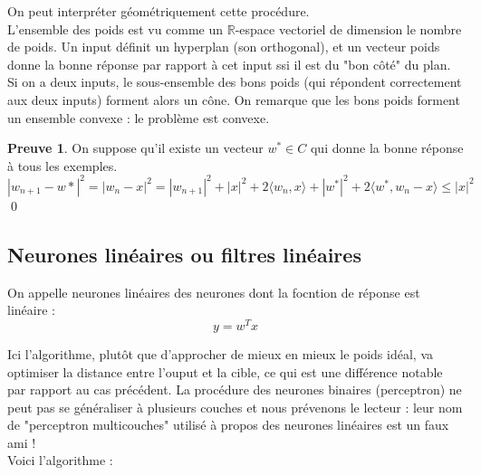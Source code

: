\documentclass{article}
\theoremstyle{definition}
\newtheorem{dem}{Preuve}
\newcommand{\R}{\mathbb R}
\begin{document}
On peut interpréter géométriquement cette procédure.\\

L'ensemble des poids est vu comme un $\R$-espace vectoriel de dimension le nombre de poids. Un input définit un hyperplan (son orthogonal), et un vecteur poids donne la bonne réponse par rapport à cet input ssi il est du "bon côté" du plan. Si on a deux inputs, le sous-ensemble des bons poids (qui répondent correctement aux deux inputs) forment alors un cône. On remarque que les bons poids forment un ensemble convexe : le problème est convexe.\\

\begin{dem}%
On suppose qu'il existe un vecteur $w^*\in C$ qui donne la bonne réponse à tous les exemples.\\
\[|w_{n+1}-w*|^2=|w_n-x|^2=|w_{n+1}|^2+|x|^2+2\langle w_n,x\rangle+|w^*|^2+2\langle w^*,w_n-x\rangle \leq |x|^2\]
\qed
\end{dem}

\subsection{Neurones linéaires ou filtres linéaires}
On appelle neurones linéaires des neurones dont la focntion de réponse est linéaire :
\[y=w^Tx\]

Ici l'algorithme, plutôt que d'approcher de mieux en mieux le poids idéal, va optimiser la distance entre l'ouput et la cible, ce qui est une différence notable par rapport au cas précédent. La procédure des neurones binaires (perceptron) ne peut pas se généraliser à plusieurs couches et nous prévenons le lecteur : leur nom de "perceptron multicouches" utilisé à propos des neurones linéaires est un faux ami ! \\

Voici l'algorithme :\\

\\
\\
\end{document}
